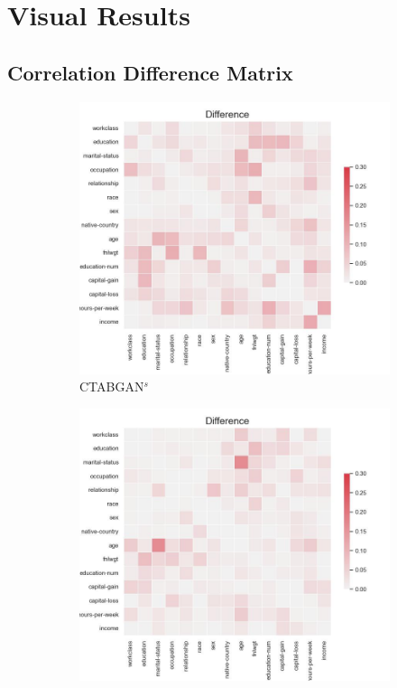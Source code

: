 \section{Visual Results}
\label{A:Visual_results}
\subsection[]{Correlation Difference Matrix}
\label{A:corr_matrix}

\begin{figure}[h]
	\centering
	\begin{subfigure}{0.3\textwidth}
		\includegraphics[width=\textwidth]{images/correlation_difference/ctabgan_simTune.jpg}
		\caption{CTABGAN$^s$}
	\end{subfigure}
	\begin{subfigure}{0.3\textwidth}
		\includegraphics[width=\textwidth]{images/correlation_difference/ctabgan+_simTune.jpg}

\end{subfigure}
\end{figure}

